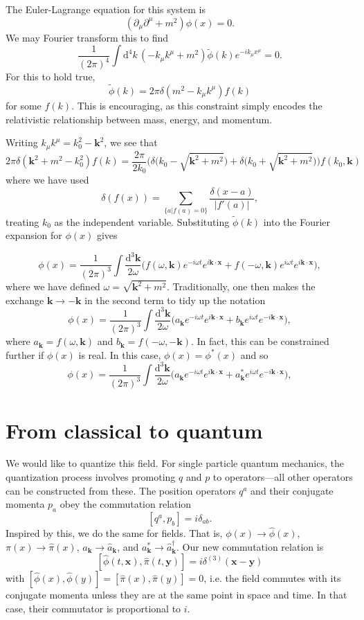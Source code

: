 \documentclass{article}
\begin{document}
	The Euler-Lagrange equation for this system is
	\[
		(\partial_\mu\partial^\mu + m^2)\phi(x) = 0.
	\]
	We may Fourier transform this to find
	\[
		\frac{1}{(2\pi)^4}\int\mathrm{d}^4k\,(-k_\mu k^\mu + m^2)\tilde{\phi}(k)e^{-ik_\mu x^\mu} = 0.
	\]
	For this to hold true,
	\[
		\tilde{\phi}(k) = 2\pi\delta(m^2 - k_\mu k^\mu)f(k)
	\]
	for some $f(k)$. This is encouraging, as this constraint simply encodes the relativistic relationship between mass, energy, and momentum.
	
	Writing $k_\mu k^\mu = k_0^2 - \mathbf{k}^2$, we see that
	\[
		2\pi\delta(\mathbf{k}^2 + m^2 - k_0^2)f(k) = \frac{2\pi}{2k_0}\Big(\delta\big(k_0 - \sqrt{\mathbf{k}^2 + m^2}\big) + \delta\big(k_0 + \sqrt{\mathbf{k}^2 + m^2}\big)\Big)f(k_0, \mathbf{k})
	\]
	where we have used
	\[
		\delta(f(x)) = \sum_{\{a | f(a) = 0\}}\frac{\delta(x - a)}{|f'(a)|},
	\]
	treating $k_0$ as the independent variable. Substituting $\tilde{\phi}(k)$ into the Fourier expansion for $\phi(x)$ gives
	
	\[
		\phi(x) = \frac{1}{(2\pi)^3}\int\frac{\mathrm{d}^3\mathbf{k}}{2\omega}\Big(f(\omega, \mathbf{k})e^{-i\omega t}e^{i\mathbf{k}\cdot\mathbf{x}} + f(-\omega, \mathbf{k})e^{i\omega t}e^{i\mathbf{k}\cdot\mathbf{x}}\Big),
	\]
	where we have defined $\omega = \sqrt{\mathbf{k}^2 + m^2}$. Traditionally, one then makes the exchange $\mathbf{k} \to -\mathbf{k}$ in the second term to tidy up the notation
	\[
		\phi(x) = \frac{1}{(2\pi)^3}\int\frac{\mathrm{d}^3\mathbf{k}}{2\omega}\Big(a_{\mathbf{k}}e^{-i\omega t}e^{i\mathbf{k}\cdot\mathbf{x}} + b_{\mathbf{k}}e^{i\omega t}e^{-i\mathbf{k}\cdot\mathbf{x}}\Big),
	\]
	where $a_\mathbf{k} = f(\omega,\mathbf{k})$ and $b_\mathbf{k} = f(-\omega, -\mathbf{k})$. In fact, this can be constrained further if $\phi(x)$ is real. In this case, $\phi(x) = \phi^*(x)$ and so
	\[
	\phi(x) = \frac{1}{(2\pi)^3}\int\frac{\mathrm{d}^3\mathbf{k}}{2\omega}\Big(a_{\mathbf{k}}e^{-i\omega t}e^{i\mathbf{k}\cdot\mathbf{x}} + a_{\mathbf{k}}^* e^{i\omega t}e^{-i\mathbf{k}\cdot\mathbf{x}}\Big),
	\]	

	\section{From classical to quantum}
	
	We would like to quantize this field. For single particle quantum mechanics, the quantization process involves promoting $q$ and $p$ to operators---all other operators can be constructed from these. The position operators $q^a$ and their conjugate momenta $p_a$ obey the commutation relation
	\[
		[q^a, p_b] = i\delta_{ab}.
	\]
	Inspired by this, we do the same for fields. That is, $\phi(x) \to \hat{\phi}(x)$, $\pi(x) \to \hat{\pi}(x)$, $a_{\mathbf{k}} \to \hat{a}_{\mathbf{k}}$, and $a^*_{\mathbf{k}} \to \hat{a}_{\mathbf{k}}^\dagger$. Our new commutation relation is
	\[
		[\hat{\phi}(t, \mathbf{x}), \hat{\pi}(t, \mathbf{y})] = i\delta^{(3)}(\mathbf{x} - \mathbf{y})
	\]
	with $[\hat{\phi}(x), \hat{\phi}(y)] = [\hat{\pi}(x), \hat{\pi}(y)] = 0$, i.e. the field commutes with its conjugate momenta unless they are at the same point in space and time. In that case, their commutator is proportional to $i$.
	
\end{document}
